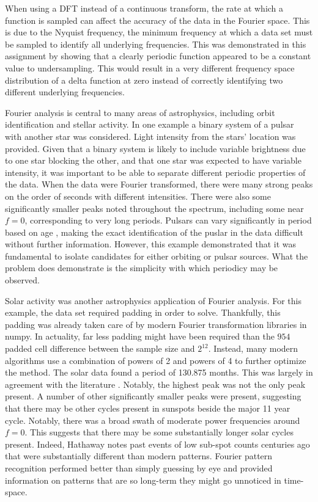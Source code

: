 \message{ !name(Assn2.tex)}\documentclass[twocolumn]{article}
\begin{document}
When using a DFT instead of a continuous transform, the rate at which a function is sampled can affect the accuracy of the data in the Fourier space. This is due to the Nyquist frequency, the minimum frequency at which a data set must be sampled to identify all underlying frequencies. This was demonstrated in this assignment by showing that a clearly periodic function appeared to be a constant value to undersampling. This would result in a very different frequency space distribution of a delta function at zero instead of correctly identifying two different underlying frequencies.

Fourier analysis is central to many areas of astrophysics, including orbit identification and stellar activity. In one example a binary system of a pulsar with another star was considered. Light intensity from the stars' location was provided. Given that a binary system is likely to include variable brightness due to one star blocking the other, and that one star was expected to have variable intensity, it was important to be able to separate different periodic properties of the data. When the data were Fourier transformed, there were many strong peaks on the order of seconds with different intensities. There were also some significantly smaller peaks noted throughout the spectrum, including some near $f=0$, corresponding to very long periods. Pulsars can vary significantly in period based on age \cite{pulsar}, making the exact identification of the puslar in the data difficult without further information. However, this example demonstrated that it was fundamental to isolate candidates for either orbiting or pulsar sources. What the problem does demonstrate is the simplicity with which periodicy may be observed.

Solar activity was another astrophysics application of Fourier analysis. For this example, the data set required padding in order to solve. Thankfully, this padding was already taken care of by modern Fourier transformation libraries in numpy. In actuality, far less padding might have been required than the $954$ padded cell difference between the sample size and $2^{12}$. Instead, many modern algorithms use a combination of powers of 2 and powers of 4 to further optimize the method. The solar data found a period of 130.875 months. This was largely in agreement with the literature \cite{sunspots}. Notably, the highest peak was not the only peak present. A number of other significantly smaller peaks were present, suggesting that there may be other cycles present in sunspots beside the major 11 year cycle. Notably, there was a broad swath of moderate power frequencies around $f=0$. This suggests that there may be some substantially longer solar cycles present. Indeed, Hathaway \cite{sunspots} notes past events of low sub-spot counts centuries ago that were substantially different than modern patterns. Fourier pattern recognition performed better than simply guessing by eye and provided information on patterns that are so long-term they might go unnoticed in time-space.
\end{document}
